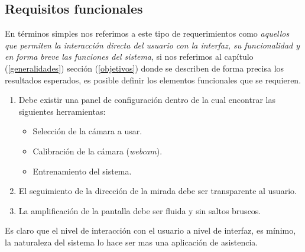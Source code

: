 \documentclass[12pt]{book} %
\begin{document}
	\subsection{Requisitos funcionales \label{funcionales}}
		En términos simples nos referimos a este tipo de requerimientos como \textit{aquellos que permiten la interacción directa del usuario
		con la interfaz, su funcionalidad y en forma breve las funciones del sistema}, si nos referimos al capítulo (\ref{generalidades}) sección
		(\ref{objetivos}) donde se describen de forma precisa los resultados esperados, es posible definir los elementos funcionales que se requieren.
		
		\begin{enumerate}
			\item Debe existir una panel de configuración dentro de la cual encontrar las siguientes herramientas:
				\begin{itemize}
					\item Selección de la cámara a usar.
					\item Calibración de la cámara (\textit{webcam}).
					\item Entrenamiento del sistema.
				\end{itemize}
		\item El seguimiento de la dirección de la mirada debe ser transparente al usuario.
			\item La amplificación de la pantalla debe ser fluida y sin saltos bruscos.
			
		\end{enumerate}
		
		Es claro que el nivel de interacción con el usuario a nivel de interfaz, es mínimo, la naturaleza del sistema lo hace ser mas una 
		aplicación de asistencia.
		
\end{document}
